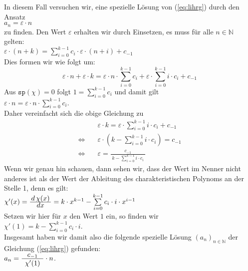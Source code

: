 \begin{enumerate}
      In diesem Fall versuchen wir, eine spezielle L\"osung von (\ref{eq:lihrg}) durch den
      Ansatz \\[0.1cm]
      \hspace*{1.3cm} $a_n = \varepsilon \cdot n $ \\[0.1cm]
      zu finden.  Den Wert $\varepsilon$ erhalten wir durch Einsetzen, es muss f\"ur 
      alle $n\in\mathbb{N}$ gelten: \\[0.1cm]
      \hspace*{1.3cm} 
      $\varepsilon \cdot (n + k) = \sum\limits_{i=0}^{k-1} c_{i} \cdot \varepsilon \cdot (n + i) + c_{-1}$  
      \\[0.1cm]
      Dies formen wir wie folgt um:
      \[
        \varepsilon \cdot n + \varepsilon \cdot k = 
        \varepsilon \cdot n \cdot \sum\limits_{i=0}^{k-1} c_{i} +
        \varepsilon \cdot \sum\limits_{i=0}^{k-1} i \cdot c_{i} + c_{-1} 
      \]
      Aus  $\mathtt{sp}(\chi) = 0$ folgt $1  =  \sum\limits_{i=0}^{k-1} c_i$
      und damit gilt \\[0.1cm]
      \hspace*{1.3cm} 
      $\varepsilon \cdot n = \varepsilon \cdot n \cdot \sum\limits_{i=0}^{k-1} c_{i}$.
      \\[0.1cm]
      Daher vereinfacht sich die obige Gleichung zu 
      \[
      \begin{array}{ll}
      & \varepsilon \cdot k = \varepsilon \cdot \sum\limits_{i=0}^{k-1} i \cdot c_{i} + c_{-1} \\[0.4cm]
      \Leftrightarrow\quad 
      & \varepsilon \cdot \left(k - \sum\limits_{i=0}^{k-1} i \cdot c_{i}\right) = c_{-1} 
      \\[0.5cm]
      \Leftrightarrow\quad 
      & \varepsilon = \frac{\displaystyle c_{-1}}{\displaystyle \; k - \sum\limits_{i=0}^{k-1} i \cdot c_{i}\;} 
      \end{array}
      \]
      Wenn wir genau hin schauen, dann sehen wir, dass der Wert im Nenner nicht anderes ist
      als der Wert der Ableitung des charakteristischen Polynoms an der Stelle 1, denn es gilt: \\[0.1cm]
      \hspace*{1.3cm} 
      $\chi'(x) =\bruch{d\,\chi(x)}{dx} = k \cdot x^{k-1} - \sum\limits_{i=0}^{k-1} c_{i}\cdot i \cdot x^{i-1}$
      \\[0.1cm]
      Setzen wir hier f\"ur $x$ den Wert $1$ ein, so finden wir \\[0.1cm]
      \hspace*{1.3cm} 
      $\chi'(1) = k - \sum\limits_{i=0}^{k-1} c_{i}\cdot i$. 
      \\[0.1cm]
      Insgesamt haben wir damit also die folgende spezielle L\"osung $(a_n)_{n\in\mathbb{N}}$
      der Gleichung (\ref{eq:lihrg}) gefunden: \\[0.1cm]
      \hspace*{1.3cm} $a_n = \bruch{c_{-1}}{\;\chi'(1)\;}\cdot n$.


\end{enumerate}
